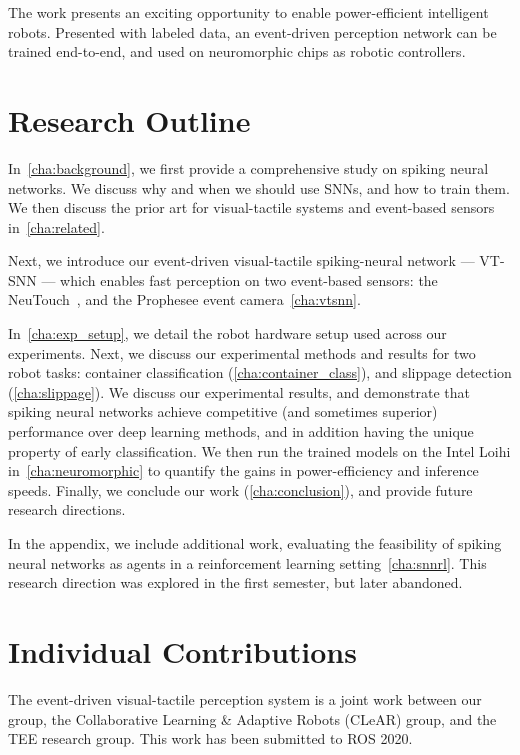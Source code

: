 \documentclass[fyp]{socreport}
\begin{document}
The work presents an exciting opportunity to enable power-efficient intelligent
robots. Presented with labeled data, an event-driven perception network can be
trained end-to-end, and used on neuromorphic chips as robotic controllers.

\section{Research Outline}

In~\autoref{cha:background}, we first provide a comprehensive study on spiking
neural networks. We discuss why and when we should use SNNs, and how to train
them. We then discuss the prior art for visual-tactile systems and event-based
sensors in~\autoref{cha:related}.

Next, we introduce our event-driven visual-tactile spiking-neural network
--- VT-SNN --- which enables fast perception on two event-based sensors: the
NeuTouch~\cite{aiskinLee}, and the Prophesee event camera~\autoref{cha:vtsnn}.

In~\autoref{cha:exp_setup}, we detail the robot hardware setup used across our
experiments. Next, we discuss our experimental methods and results for two
robot tasks: container classification (\autoref{cha:container_class}), and
slippage detection (\autoref{cha:slippage}). We discuss our experimental
results, and demonstrate that spiking neural networks achieve competitive (and
sometimes superior) performance over deep learning methods, and in addition
having the unique property of early classification.
We then run the trained models on the Intel Loihi in~\autoref{cha:neuromorphic}
to quantify the gains in power-efficiency and inference speeds. Finally, we
conclude our work (\autoref{cha:conclusion}), and provide future research
directions.

In the appendix, we include additional work, evaluating the feasibility of
spiking neural networks as agents in a reinforcement learning
setting~\autoref{cha:snnrl}. This research direction was explored in the first
semester, but later abandoned.

\section{Individual Contributions}
The event-driven visual-tactile perception system is a joint work between our
group, the Collaborative Learning \& Adaptive Robots (CLeAR) group, and the TEE
research group. This work has been submitted to ROS 2020.
\end{document}
